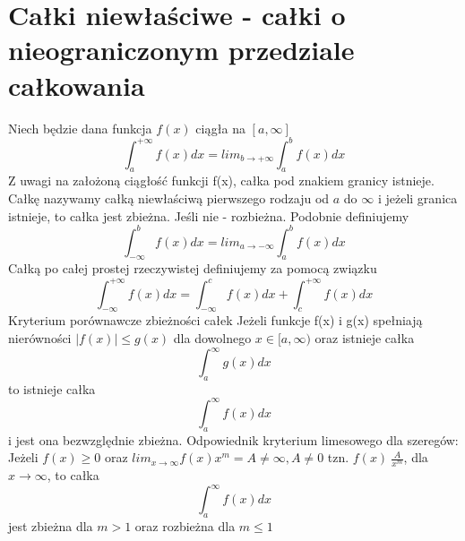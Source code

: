 \documentclass[10pt]{article}
\begin{document}
\section{Całki niewłaściwe - całki o nieograniczonym przedziale całkowania}
    Niech będzie dana funkcja $f(x)$ ciągła na $[a, \infty ]$
    $$\int_{a}^{+ \infty}f(x)dx=lim_{b \rightarrow + \infty} \int_{a}^{b}f(x)dx$$
    Z uwagi na założoną ciągłość funkcji f(x), całka pod znakiem granicy istnieje.
    Całkę nazywamy całką niewłaściwą pierwszego rodzaju od $a$ do $\infty$ i jeżeli granica istnieje, to całka jest zbieżna. Jeśli nie - rozbieżna. Podobnie definiujemy
    $$\int_{-\infty}^{b}f(x)dx=lim_{a \rightarrow - \infty} \int_{a}^{b}f(x)dx$$
    Całką po całej prostej rzeczywistej definiujemy za pomocą związku
    $$\int_{-\infty}^{+ \infty}f(x)dx=\int_{-\infty}^{c}f(x)dx + \int_{c}^{+ \infty}f(x)dx$$
    Kryterium porównawcze zbieżności całek
    Jeżeli funkcje f(x) i g(x) spełniają nierówności 
    $|f(x)| \leq g(x)$ dla dowolnego $x \in [a, \infty)$
    oraz istnieje całka $$\int_{a}^{\infty}g(x)dx$$ to istnieje całka $$\int_{a}^{\infty}f(x)dx$$ i jest ona bezwzględnie zbieżna.
    Odpowiednik kryterium limesowego dla szeregów:
    Jeżeli $f(x) \geq 0$ oraz $lim_{x \rightarrow \infty} f(x)x^m=A \neq \infty, A \neq 0$ tzn. $f(x)~\frac{A}{x^m}$, dla $x \rightarrow \infty$, to całka $$\int_{a}^{\infty} f(x)dx$$ jest zbieżna dla $m > 1 $ oraz rozbieżna dla $m \leq 1$
\end{document}
